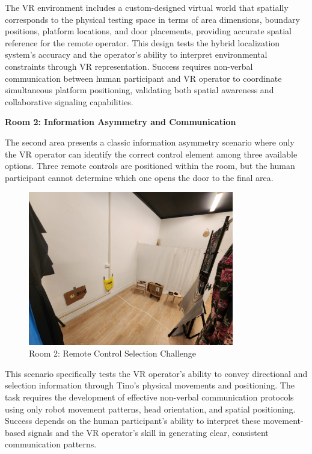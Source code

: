 The VR environment includes a custom-designed virtual world that spatially corresponds to the physical testing space in terms of area dimensions, boundary positions, platform locations, and door placements, providing accurate spatial reference for the remote operator. This design tests the hybrid localization system's accuracy and the operator's ability to interpret environmental constraints through VR representation. Success requires non-verbal communication between human participant and VR operator to coordinate simultaneous platform positioning, validating both spatial awareness and collaborative signaling capabilities.

\textbf{Room 2: Information Asymmetry and Communication}

The second area presents a classic information asymmetry scenario where only the VR operator can identify the correct control element among three available options. Three remote controls are positioned within the room, but the human participant cannot determine which one opens the door to the final area.

\begin{figure}[H]
    \centering
    \includegraphics[width=0.8\textwidth]{Images/LabVisualAids (3).jpg}
    \caption{Room 2: Remote Control Selection Challenge}
    \label{fig:room2_remote_challenge}
\end{figure}

This scenario specifically tests the VR operator's ability to convey directional and selection information through Tino's physical movements and positioning. The task requires the development of effective non-verbal communication protocols using only robot movement patterns, head orientation, and spatial positioning. Success depends on the human participant's ability to interpret these movement-based signals and the VR operator's skill in generating clear, consistent communication patterns.

